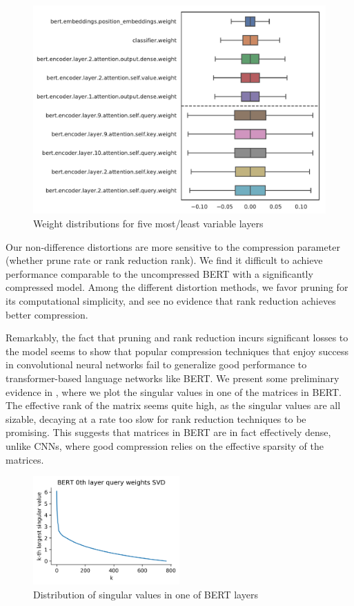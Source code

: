 \documentclass[10pt]{article}
\begin{document}
\begin{figure}[htb]
\centering
\includegraphics[width=.5\textwidth]{../figs/value_by_layer.pdf}
\caption{Weight distributions for five most/least variable layers}
\label{fig:weightsbylayer}
\end{figure}

Our non-difference distortions are more sensitive to the compression parameter
(whether prune rate or rank reduction rank). We find it difficult to achieve performance
comparable to the uncompressed BERT with a significantly compressed model. Among
the different distortion methods, we favor pruning for its computational
simplicity, and see no evidence that rank reduction achieves better compression.

Remarkably, the fact that pruning and rank reduction incurs significant
losses to the
model seems to show that popular compression techniques that enjoy success
in convolutional neural networks fail to generalize good performance to
transformer-based language networks like BERT. We present some preliminary
evidence in , where we plot the singular values
in one of the matrices in BERT. The effective rank of the matrix seems
quite high, as the singular values are all sizable, decaying at a rate too
slow for rank reduction techniques to be promising. This suggests that
matrices in BERT are in fact effectively dense, unlike CNNs, where
good compression relies on the effective sparsity of the matrices. 
\begin{figure}[tb]
    \centering
    \includegraphics[width=0.5\textwidth]
    {../figs/svd-singular-vals-distribution.png}
    \caption{Distribution of singular values in one of BERT layers}
    \label{fig:singular-values}
\end{figure}
\end{document}
